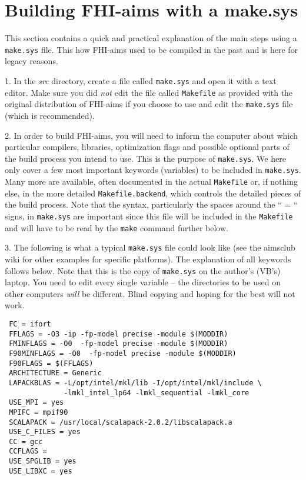 \chapter{Building FHI-aims with a make.sys}
\label{Sec:makesys}

This section contains a quick and practical explanation
of the main steps using a \texttt{make.sys} file. This how FHI-aims used to be compiled in the past and is here for legacy reasons.

1. In the \emph{src} directory, create a file called \texttt{make.sys}
and open it with a text editor. Make sure you did \textit{not} edit
the file called \texttt{Makefile} as provided with the original
distribution of FHI-aims if you choose to use and edit the
\texttt{make.sys} file (which is recommended).

2. In order to build FHI-aims, you will need to inform the computer
about which particular compilers, libraries, optimization flags and
possible optional parts of the build process you intend to use. This
is the purpose of \texttt{make.sys}. We here only cover a few most
important keywords (variables) to be included in
\texttt{make.sys}. Many more are available, often documented in the
actual \texttt{Makefile} or, if nothing else, in the more detailed
\texttt{Makefile.backend}, which controls the detailed pieces of the
build process. Note that the syntax, particularly the spaces around
the `` = `` signs, in \texttt{make.sys} are important since this file
will be included in the \texttt{Makefile} and will have to be read
by the \texttt{make} command further below.

3. The following is what a typical \texttt{make.sys} file could look like (see
the aimsclub wiki for other examples for specific platforms). The
explanation of all keywords follows below. Note that this is the copy
of \texttt{make.sys} on the author's (VB's) laptop. You 
need to edit every single variable -- the directories to be used on
other computers \emph{will} be different. Blind copying and hoping
for the best will not work.

\begin{verbatim}
 FC = ifort
 FFLAGS = -O3 -ip -fp-model precise -module $(MODDIR)
 FMINFLAGS = -O0  -fp-model precise -module $(MODDIR)
 F90MINFLAGS = -O0  -fp-model precise -module $(MODDIR)
 F90FLAGS = $(FFLAGS)
 ARCHITECTURE = Generic
 LAPACKBLAS = -L/opt/intel/mkl/lib -I/opt/intel/mkl/include \ 
              -lmkl_intel_lp64 -lmkl_sequential -lmkl_core 
 USE_MPI = yes
 MPIFC = mpif90
 SCALAPACK = /usr/local/scalapack-2.0.2/libscalapack.a
 USE_C_FILES = yes
 CC = gcc
 CCFLAGS =
 USE_SPGLIB = yes
 USE_LIBXC = yes
\end{verbatim}

